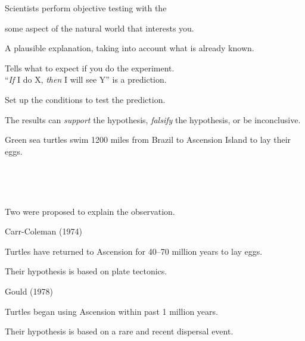 \documentclass[t]{beamer}
\begin{document}
\begin{frame}[t]{Scientists perform objective testing with the }

	\hangpara {} some aspect of the natural world that interests you.
	\pause

	\hangpara {} A plausible explanation, taking into account what is already known.
	\pause
	
	\hangpara {} Tells what to expect if you do the experiment.\\ “\textit{If} I do X, \textit{then} I will see Y” is a prediction.
	\pause
	
	\hangpara {} Set up the conditions to test the prediction.
	\pause
	
	\hangpara {} The results can \textit{support} the hypothesis, \textit{falsify} the hypothesis, or be inconclusive.

\end{frame}


{
\begin{frame}[b,plain]{ Green sea turtles swim 1200 miles from Brazil to Ascension Island to lay their eggs.}

\hfill\tiny\textcolor{white}{Laszlo Ilyes, Flickr, }
\end{frame}
}

{
\begin{frame}[b]

\hfill\tiny\textcolor{white}{Modified from Strebe, Wikimedia, }
\end{frame}
}


\begin{frame}[t]{Two  were proposed to explain the observation.}
	\setlength{\columnseprule}{0.4pt}

	\begin{multicols}{2}
	
		\hangpara Carr-Coleman (1974)
		
		\hangpara Turtles have returned to Ascension for 40–70 million years to lay eggs.
		
		\hangpara Their hypothesis is based on plate tectonics. 
		
	\columnbreak
	
		\hangpara Gould (1978)
		
		\hangpara Turtles began using Ascension within past 1 million years.
		
		\hangpara Their hypothesis is based on a rare and recent dispersal event.
	\end{multicols}
\end{frame}
\end{document}
